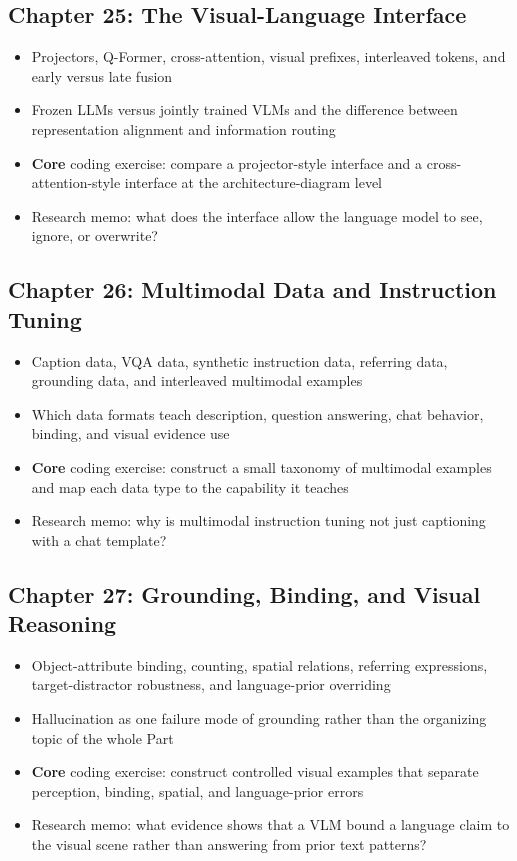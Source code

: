 \documentclass[11pt]{article}
\begin{document}
\subsection{Chapter 25: The Visual-Language Interface}

\begin{itemize}
    \item Projectors, Q-Former, cross-attention, visual prefixes, interleaved tokens, and early versus late fusion
    \item Frozen LLMs versus jointly trained VLMs and the difference between representation alignment and information routing
    \item \textbf{Core} coding exercise: compare a projector-style interface and a cross-attention-style interface at the architecture-diagram level
    \item Research memo: what does the interface allow the language model to see, ignore, or overwrite?
\end{itemize}

\subsection{Chapter 26: Multimodal Data and Instruction Tuning}

\begin{itemize}
    \item Caption data, VQA data, synthetic instruction data, referring data, grounding data, and interleaved multimodal examples
    \item Which data formats teach description, question answering, chat behavior, binding, and visual evidence use
    \item \textbf{Core} coding exercise: construct a small taxonomy of multimodal examples and map each data type to the capability it teaches
    \item Research memo: why is multimodal instruction tuning not just captioning with a chat template?
\end{itemize}

\subsection{Chapter 27: Grounding, Binding, and Visual Reasoning}

\begin{itemize}
    \item Object-attribute binding, counting, spatial relations, referring expressions, target-distractor robustness, and language-prior overriding
    \item Hallucination as one failure mode of grounding rather than the organizing topic of the whole Part
    \item \textbf{Core} coding exercise: construct controlled visual examples that separate perception, binding, spatial, and language-prior errors
    \item Research memo: what evidence shows that a VLM bound a language claim to the visual scene rather than answering from prior text patterns?
\end{itemize}
\end{document}
